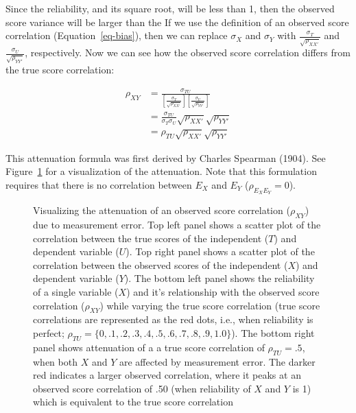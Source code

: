 \documentclass[
  letterpaper,
  DIV=11,
  numbers=noendperiod]{scrreprt}
\begin{document}
Since the reliability, and its square root, will be less than 1, then
the observed score variance will be larger than the If we use the
definition of an observed score correlation (Equation~\ref{eq-bias}),
then we can replace \(\sigma_X\) and \(\sigma_Y\) with
\(\frac{\sigma_{T}}{\sqrt{\rho_{XX'}}}\) and
\(\frac{\sigma_{U}}{\sqrt{\rho_{YY'}}}\), respectively. Now we can see
how the observed score correlation differs from the true score
correlation:

\[\begin{aligned}
\rho_{XY} &= \frac{\sigma_{T U}}{\left[\frac{\sigma_{T}}{\sqrt{\rho_{XX'}}} \right] \left[ \frac{\sigma_{U}}{\sqrt{\rho_{YY'}}} \right] } \\[.3em]
&= \frac{\sigma_{T U}}{\sigma_{T}\sigma_{U}}  \sqrt{\rho_{XX'}}\sqrt{\rho_{YY'}}\\[.3em]
&= \rho_{TU} \sqrt{\rho_{XX'}}\sqrt{\rho_{YY'}} 
\end{aligned}\]

This attenuation formula was first derived by Charles Spearman (1904).
See Figure~\ref{fig-attenuation} for a visualization of the attenuation.
Note that this formulation requires that there is no correlation between
\(E_X\) and \(E_Y\) (\(\rho_{E_X E_Y}=0\)).

\begin{figure}[H]


\caption{\label{fig-attenuation}Visualizing the attenuation of an
observed score correlation (\(\rho_{XY}\)) due to measurement error. Top
left panel shows a scatter plot of the correlation between the true
scores of the independent (\(T\)) and dependent variable (\(U\)). Top
right panel shows a scatter plot of the correlation between the observed
scores of the independent (\(X\)) and dependent variable (\(Y\)). The
bottom left panel shows the reliability of a single variable (\(X\)) and
it's relationship with the observed score correlation (\(\rho_{XY}\))
while varying the true score correlation (true score correlations are
represented as the red dots, i.e., when reliability is perfect;
\(\rho_{TU}=\{0,.1,.2,.3,.4,.5,.6,.7,.8,.9,1.0\}\)). The bottom right
panel shows attenuation of a a true score correlation of
\(\rho_{TU}=.5\), when both \(X\) and \(Y\) are affected by measurement
error. The darker red indicates a larger observed correlation, where it
peaks at an observed score correlation of .50 (when reliability of \(X\)
and \(Y\) is 1) which is equivalent to the true score correlation}

\end{figure}%
\end{document}
